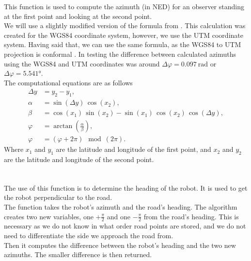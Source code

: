             This function is used to compute the azimuth (in NED) for an observer standing at the first point and looking at the second point.\\
            We will use a slightly modified version of the formula from \cite{calc_bearing}. This calculation was created for the WGS84 coordinate system, however, we use the UTM coordinate system. Having said that, we can use the same formula, as the WGS84 to UTM projection is conformal \cite{Map_projections}. In testing the difference between calculated azimuths using the WGS84 and UTM coordinates was around $\Delta\varphi=0.097\:\si{\radian}$ or $\Delta\varphi=5.541\si{\degree}$.\\
            The computational equations are as follows
            \begin{align}
                \Delta y &= y_{2} - y_{1}, \\
                \alpha &= \sin{(\Delta y)}\,\cos{(x_{2})}, \\
                \beta &= \cos{(x_{1})}\,\sin{(x_{2})} - \sin{(x_{1})}\,\cos{(x_{2})}\,\cos{(\Delta y)}, \\
                \varphi &= \arctan{\left(\frac{\alpha}{\beta}\right)}, \\
                \varphi &= (\varphi + 2\pi) \mod (2\pi).
            \end{align}
            Where $x_{1}$ and $y_{1}$ are the latitude and longitude of the first point, and $x_{2}$ and $y_{2}$ are the latitude and longitude of the second point.\\\\
        \\
            The use of this function is to determine the heading of the robot. It is used to get the robot perpendicular to the road.\\
            The function takes the robot's azimuth and the road's heading. The algorithm creates two new variables, one $+\frac{\pi}{2}$ and one $-\frac{\pi}{2}$ from the road's heading. This is necessary as we do not know in what order road points are stored, and we do not need to differentiate the side we approach the road from.\\
            Then it computes the difference between the robot's heading and the two new azimuths. The smaller difference is then returned.
    
